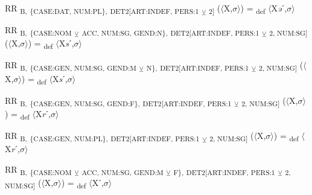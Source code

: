 {\begin{exe}
 RR \textsubscript{B,} \textsubscript{\{CASE:DAT, NUM:PL\},} \textsubscript{DET2[ART:INDEF, PERS:1} \textsubscript{${\veebar}$}\textsubscript{ 2]} ($\langle$X,$\sigma $$\rangle$) = \textsubscript{def} $\langle$X\textit{ə}ˊ,$\sigma $$\rangle$
\end{exe}

\begin{exe}
 RR \textsubscript{B,} \textsubscript{\{CASE:NOM} \textsubscript{${\veebar}$}\textsubscript{ ACC, NUM:SG, GEND:N\},} \textsubscript{DET2[ART:INDEF, PERS:1} \textsubscript{${\veebar}$}\textsubscript{ 2, NUM:SG]} ($\langle$X,$\sigma $$\rangle$) = \textsubscript{def} $\langle$X\textit{s}ˊ,$\sigma $$\rangle$
\end{exe}

\begin{exe}
 RR \textsubscript{B,} \textsubscript{\{CASE:GEN, NUM:SG, GEND:M} \textsubscript{${\veebar}$}\textsubscript{ N\},} \textsubscript{DET2[ART:INDEF, PERS:1} \textsubscript{${\veebar}$}\textsubscript{ 2, NUM:SG]} ($\langle$X,$\sigma $$\rangle$) = \textsubscript{def} $\langle$X\textit{s}ˊ,$\sigma $$\rangle$
\end{exe}

\begin{exe}
 RR \textsubscript{B,} \textsubscript{\{CASE:GEN, NUM:SG, GEND:F\},} \textsubscript{DET2[ART:INDEF, PERS:1} \textsubscript{${\veebar}$}\textsubscript{ 2, NUM:SG]} ($\langle$X,$\sigma $$\rangle$) = \textsubscript{def} $\langle$X\textit{r}ˊ,$\sigma $$\rangle$
\end{exe}

\begin{exe}
 RR \textsubscript{B,} \textsubscript{\{CASE:GEN, NUM:PL\},} \textsubscript{DET2[ART:INDEF, PERS:1} \textsubscript{${\veebar}$}\textsubscript{ 2, NUM:SG]} ($\langle$X,$\sigma $$\rangle$) = \textsubscript{def} $\langle$X\textit{r}ˊ,$\sigma $$\rangle$
\end{exe}

\begin{exe}
 RR \textsubscript{B,} \textsubscript{\{CASE:NOM} \textsubscript{${\veebar}$}\textsubscript{ ACC, NUM:SG, GEND:M} \textsubscript{${\veebar}$}\textsubscript{ F\},} \textsubscript{DET2[ART:INDEF, PERS:1} \textsubscript{${\veebar}$}\textsubscript{ 2, NUM:SG]} ($\langle$X,$\sigma $$\rangle$) = \textsubscript{def} $\langle$Xˊ,$\sigma $$\rangle$
\end{exe}

}
